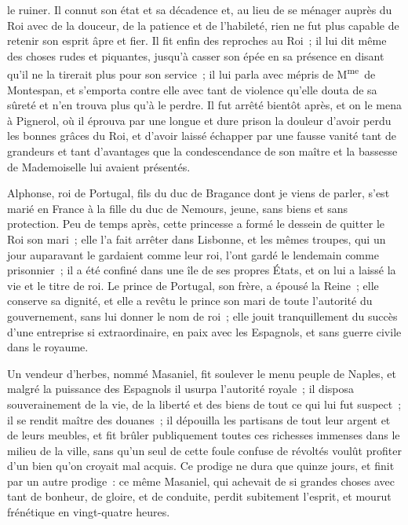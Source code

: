 \documentclass[french,twoside]{book} %
\begin{document}
le ruiner. Il connut son état et sa décadence et, au lieu de se ménager auprès du Roi avec de la douceur, de la patience et de l’habileté, rien ne fut plus capable de retenir son esprit âpre et fier. Il fit enfin des reproches au Roi ; il lui dit même des choses rudes et piquantes, jusqu’à casser son épée en sa présence en disant qu’il ne la tirerait plus pour son service ; il lui parla avec mépris de M\textsuperscript{me} de Montespan, et s’emporta contre elle avec tant de violence qu’elle douta de sa sûreté et n’en trouva plus qu’à le perdre. Il fut arrêté bientôt après, et on le mena à Pignerol, où il éprouva par une longue et dure prison la douleur d’avoir perdu les bonnes grâces du Roi, et d’avoir laissé échapper par une fausse vanité tant de grandeurs et tant d’avantages que la condescendance de son maître et la bassesse de Mademoiselle lui avaient présentés.\par
Alphonse, roi de Portugal, fils du duc de Bragance dont je viens de parler, s’est marié en France à la fille du duc de Nemours, jeune, sans biens et sans protection. Peu de temps après, cette princesse a formé le dessein de quitter le Roi son mari ; elle l’a fait arrêter dans Lisbonne, et les mêmes troupes, qui un jour auparavant le gardaient comme leur roi, l’ont gardé le lendemain comme prisonnier ; il a été confiné dans une île de ses propres États, et on lui a laissé la vie et le titre de roi. Le prince de Portugal, son frère, a épousé la Reine ; elle conserve sa dignité, et elle a revêtu le prince son mari de toute l’autorité du gouvernement, sans lui donner le nom de roi ; elle jouit tranquillement du succès d’une entreprise si extraordinaire, en paix avec les Espagnols, et sans guerre civile dans le royaume.\par
Un vendeur d’herbes, nommé Masaniel, fit soulever le menu peuple de Naples, et malgré la puissance des Espagnols il usurpa l’autorité royale ; il disposa souverainement de la vie, de la liberté et des biens de tout ce qui lui fut suspect ; il se rendit maître des douanes ; il dépouilla les partisans de tout leur argent et de leurs meubles, et fit brûler publiquement toutes ces richesses immenses dans le milieu de la ville, sans qu’un seul de cette foule confuse de révoltés voulût profiter d’un bien qu’on croyait mal acquis. Ce prodige ne dura que quinze jours, et finit par un autre prodige : ce même Masaniel, qui achevait de si grandes choses avec tant de bonheur, de gloire, et de conduite, perdit subitement l’esprit, et mourut frénétique en vingt-quatre heures.\par
\end{document}
